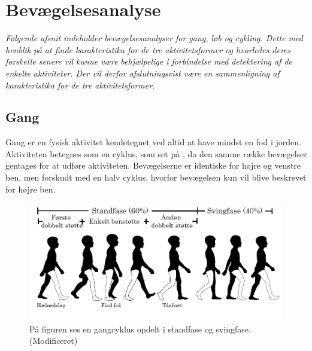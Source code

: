 \section{Bevægelsesanalyse} \label{bevaegelse}
%
\textit{Følgende afsnit indeholder bevægelsesanalyser for gang, løb og cykling. Dette med henblik på at finde karakteristika for de tre aktivitetsformer og hvorledes deres forskelle senere vil kunne være behjælpelige i forbindelse med detektering af de enkelte aktiviteter. Der vil derfor afslutningsvist være en sammenligning af karakteristika for de tre aktivitetsformer.}

\subsection{Gang}
Gang er en fysisk aktivitet kendetegnet ved altid at have mindst en fod i jorden. Aktiviteten betegnes som en cyklus, som set på , da den samme række bevægelser gentages for at udføre aktiviteten. Bevægelserne er identiske for højre og venstre ben, men forskudt med en halv cyklus, hvorfor bevægelsen kun vil blive beskrevet for højre ben. \citep{VaughanDavisOConnor1992,Whittle1990} 

\begin{figure}[H]
	\centering
	\includegraphics[scale=0.7]{figures/bProblemloesning/gang_cyklus.png}
	\caption{På figuren ses en gangcyklus opdelt i standfase og svingfase. \citep{VaughanDavisOConnor1992} (Modificeret)}
	\label{fig:gang_cyklus}
\end{figure}
	
